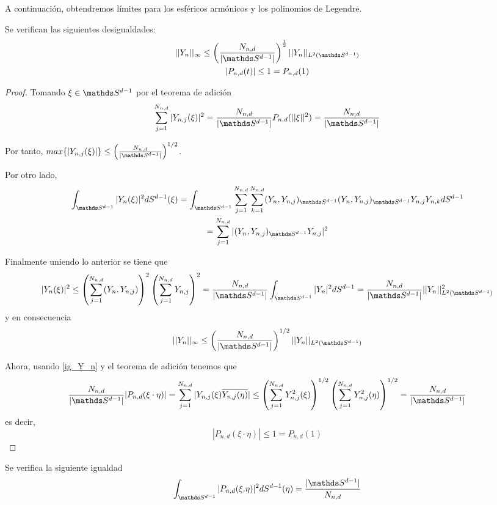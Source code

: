 A continuación, obtendremos límites para los esféricos armónicos y los polinomios de Legendre.
\begin{prop}Se verifican las siguientes desigualdades:
	\begin{gather}
		||Y_n||_\infty \le \left(\frac{N_{n,d}}{|\sphere|}\right)^{\frac{1}{2}}||Y_n||_{L^2(\sphere)} \\
		|P_{n,d}(t)| \le 1 = P_{n,d}(1)
	\end{gather}
\end{prop}
\begin{proof}Tomando $\xi \in \sphere$ por el teorema de adición 
	\begin{gather}\label{ig_Y_n}
		\sum_{j=1}^{N_{n,d}} |Y_{n,j}(\xi)|^2 = \frac{N_{n,d}}{|\sphere|} P_{n,d}(||\xi||^2) = \frac{N_{n,d}}{|\sphere|}
	\end{gather}

Por tanto, $max\{|Y_{n,j}(\xi)|\}\le \left(\frac{N_{n,d}}{|\sphere|}\right)^{1/2}$.
\medskip

Por otro lado, 
\begin{gather*}
\sphint |Y_n(\xi)|^2 dS^{d-1}(\xi) = \sphint \sum_{j=1}^{N_{n,d}} \sum_{k=1}^{N_{n,d}}(Y_n,Y_{n,j})_{\sphere}(Y_n,Y_{n,j})_{\sphere}Y_{n,j}Y_{n,k}dS^{d-1} \\=\sum_{j=1}^{N_{n,d}}|(Y_n,Y_{n,j})_{\sphere}Y_{n,j}|^2
\end{gather*}

Finalmente uniendo lo anterior se tiene que 
\begin{gather*}
|Y_n(\xi)|^2 \le \left(\sum_{j=1}^{N_{n,d}}(Y_n,Y_{n,j})\right)^2\left(\sum_{j=1}^{N_{n,d}}Y_{n,j}\right)^2 =\frac{N_{n,d}}{|\sphere|} \sphint |Y_n|^2 dS^{d-1}  =\frac{N_{n,d}}{|\sphere|}||Y_n||^2_{L^2(\sphere)}
\end{gather*}
y en consecuencia 
$$  ||Y_n||_{\infty} \le \left(\frac{N_{n,d}}{|\sphere|}\right)^{1/2} ||Y_n||_{L^2(\sphere)}$$

Ahora, usando \hyperref[]{\ref{ig_Y_n}} y el teorema de adición tenemos que
\begin{gather*}
\frac{N_{n,d}}{|\sphere|}|P_{n,d}(\xi\cdot\eta)| = \sum_{j=1}^{N_{n,d}}|Y_{n,j}(\xi)\overline{Y_{n,j}(\eta)}| \le \left(\sum_{j=1}^{N_{n,d}} Y^2_{n,j}(\xi)\right)^{1/2}\left(\sum_{j=1}^{N_{n,d}} Y^2_{n,j}(\eta)\right)^{1/2} = \frac{N_{n,d}}{|\sphere|}
\end{gather*}
es decir, 
$$
|P_{n,d}(\xi\cdot\eta)| \le 1 = P_{n,d}(1)
$$
\end{proof}
\begin{prop}\label{prop:2}Se verifica la siguiente igualdad
	$$\sphint |P_{n,d}(\xi.\eta)|^2 dS^{d-1}(\eta) = \frac{|\sphere|}{N_{n,d}}
	$$
\end{prop}
